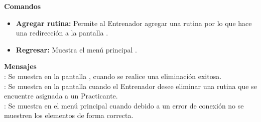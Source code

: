 \textbf{\textcolor[rgb]{0, 0, 0.545098}{Comandos}}
\begin{itemize}
	\item \textbf{\textcolor[rgb]{0, 0, 0.545098}{Agregar rutina:}} Permite al Entrenador agregar una rutina por lo que hace una redirección a la pantalla .
	\item \textbf{\textcolor[rgb]{0, 0, 0.545098}{Regresar:}} Muestra el menú principal .
\end{itemize}
\vspace{1em}

\textbf{\textcolor[rgb]{0, 0, 0.545098}{Mensajes}}\\
	
\textbf{}: Se muestra en la pantalla , cuando se realice una eliminación exitosa.\\

\textbf{}: Se muestra en la pantalla  cuando el Entrenador desee eliminar una rutina que se encuentre asignada a un Practicante.\\
	
\textbf{}: Se muestra en el menú principal  cuando debido a un error de conexión no se muestren los elementos de forma correcta.\\

\clearpage
